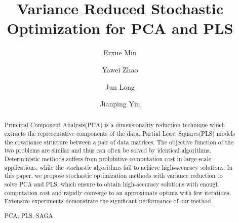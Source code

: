 \documentclass[runningheads,a4paper]{llncs}
\newcommand{\keywords}[1]{\par\addvspace\baselineskip
\noindent\keywordname\enspace\ignorespaces#1}
\begin{document}
\mainmatter  %

\title{Variance Reduced Stochastic Optimization for PCA and PLS}


%
%
\author{Erxue Min
\and Yawei Zhao\and Jun Long\and Jianping Yin
}
%


%
%

\maketitle


\begin{abstract}
Principal Component Analysis(PCA) is a dimensionality reduction technique which extracts the representative components of the data. Partial Least Squares(PLS) models the covariance structure between a pair of data matrices. The objective function of the two problems are similar and thus can often be solved by identical algorithms. Deterministic methods suffers from prohibitive computation cost in large-scale applications, while the stochastic algorithms fail to achieve high-accuracy solutions. In this paper, we propose stochastic optimization methods with variance reduction to solve PCA and PLS, which ensure to obtain high-accuracy solutions with enough computation cost and rapidly converge to an approximate optima with  few iterations. Extensive experiments demonstrate the significant performance of our method.
\keywords{PCA, PLS, SAGA}
\end{abstract}
\end{document}
